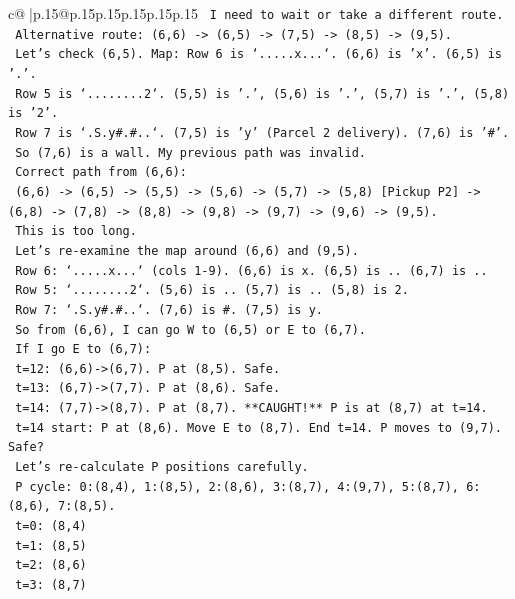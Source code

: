 \documentclass{article}
\begin{document}
{\begin{supertabular}{c@{$\;$}|p{.15\linewidth}@{}p{.15\linewidth}p{.15\linewidth}p{.15\linewidth}p{.15\linewidth}p{.15\linewidth}}
{{{\texttt{   I need to wait or take a different route.} \\
\texttt{   Alternative route: (6,6) {-}> (6,5) {-}> (7,5) {-}> (8,5) {-}> (9,5).} \\
\texttt{   Let's check (6,5). Map: Row 6 is `.....x...`. (6,6) is 'x'. (6,5) is '.'.} \\
\texttt{   Row 5 is `........2`. (5,5) is '.', (5,6) is '.', (5,7) is '.', (5,8) is '2'.} \\
\texttt{   Row 7 is `.S.y\#.\#..`. (7,5) is 'y' (Parcel 2 delivery). (7,6) is '\#'.} \\
\texttt{   So (7,6) is a wall. My previous path was invalid.} \\
\texttt{   Correct path from (6,6):} \\
\texttt{   (6,6) {-}> (6,5) {-}> (5,5) {-}> (5,6) {-}> (5,7) {-}> (5,8) {[}Pickup P2{]} {-}> (6,8) {-}> (7,8) {-}> (8,8) {-}> (9,8) {-}> (9,7) {-}> (9,6) {-}> (9,5).} \\
\texttt{   This is too long.} \\
\texttt{   Let's re{-}examine the map around (6,6) and (9,5).} \\
\texttt{   Row 6: `.....x...` (cols 1{-}9). (6,6) is x. (6,5) is .. (6,7) is ..} \\
\texttt{   Row 5: `........2`. (5,6) is .. (5,7) is .. (5,8) is 2.} \\
\texttt{   Row 7: `.S.y\#.\#..`. (7,6) is \#. (7,5) is y.} \\
\texttt{   So from (6,6), I can go W to (6,5) or E to (6,7).} \\
\texttt{   If I go E to (6,7):} \\
\texttt{     t=12: (6,6){-}>(6,7). P at (8,5). Safe.} \\
\texttt{     t=13: (6,7){-}>(7,7). P at (8,6). Safe.} \\
\texttt{     t=14: (7,7){-}>(8,7). P at (8,7). **CAUGHT!** P is at (8,7) at t=14.} \\
\texttt{     t=14 start: P at (8,6). Move E to (8,7). End t=14. P moves to (9,7). Safe?} \\
\texttt{     Let's re{-}calculate P positions carefully.} \\
\texttt{     P cycle: 0:(8,4), 1:(8,5), 2:(8,6), 3:(8,7), 4:(9,7), 5:(8,7), 6:(8,6), 7:(8,5).} \\
\texttt{     t=0: (8,4)} \\
\texttt{     t=1: (8,5)} \\
\texttt{     t=2: (8,6)} \\
\texttt{     t=3: (8,7)} \\
}}}
\end{supertabular}}
\end{document}
